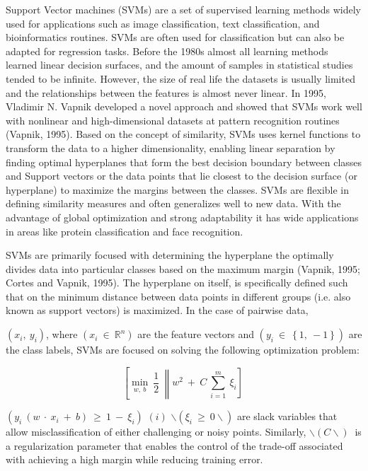 Support Vector machines (SVMs) are a set of supervised learning methods
widely used for applications such as image classification, text
classification, and bioinformatics routines. SVMs are often used for
classification but can also be adapted for regression tasks. Before the
1980s almost all learning methods learned linear decision surfaces, and
the amount of samples in statistical studies tended to be infinite.
However, the size of real life the datasets is usually limited and the
relationships between the features is almost never linear. In 1995,
Vladimir N. Vapnik developed a novel approach and showed that SVMs work
well with nonlinear and high-dimensional datasets at pattern recognition
routines (Vapnik, 1995). Based on the concept of similarity, SVMs uses
kernel functions to transform the data to a higher dimensionality,
enabling linear separation by finding optimal hyperplanes that form the
best decision boundary between classes and Support vectors or the data
points that lie closest to the decision surface (or hyperplane) to
maximize the margins between the classes. SVMs are flexible in defining
similarity measures and often generalizes well to new data. With the
advantage of global optimization and strong adaptability it has wide
applications in areas like protein classification and face recognition.

SVMs are primarily focused with determining the hyperplane the optimally
divides data into particular classes based on the maximum margin
(Vapnik, 1995; Cortes and Vapnik, 1995). The hyperplane on itself, is
specifically defined such that on the minimum distance between data
points in different groups (i.e. also known as support vectors) is
maximized. In the case of pairwise data,

$\left( x_{i},\ y_{i} \right)$, where
$\left( x_{i}\  \in \ {\mathbb{R}}^{n} \right)$ are the
feature vectors and
$\left( y_{i}\  \in \ \left\{ 1,\  - 1 \right\} \right)$ are the class
labels, SVMs are focused on solving the following optimization
problem:

\[\left\lbrack \min_{w,\ b}\ \frac{1}{2}\ \left\| w_{}^{2}\  + \ C\ \sum_{i = 1}^{m}\ \xi_{i} \right\rbrack \right.\ \]


\(\left( y_{i}\ \left( w\  \cdot \ x_{i}\  + \ b \right)\  \geq \ 1\  - \ \xi_{i} \right)\)
 \((i)\)
\(\backslash\left( \xi_{i}\  \geq \ 0\backslash \right)\) are slack
variables that allow misclassification of either challenging or noisy
points. Similarly, \(\backslash(C\backslash)\ \) is a
regularization parameter that enables the control of the trade-off
associated with achieving a high margin while reducing training error.

